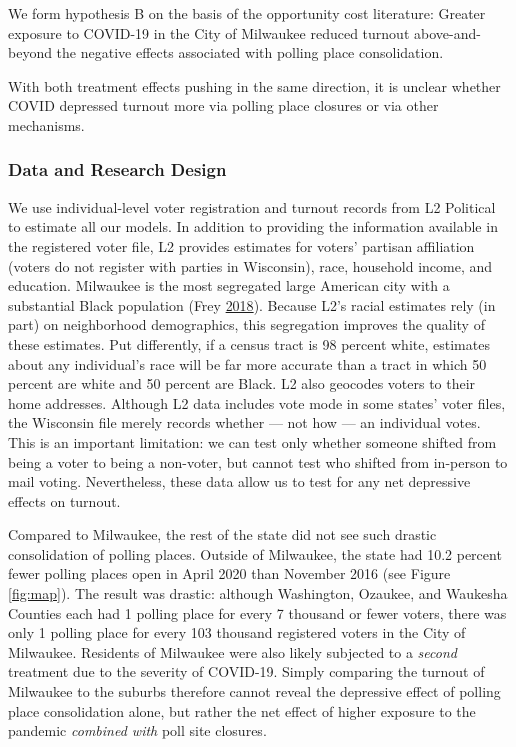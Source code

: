\documentclass[
  12pt,
]{article}
\begin{document}
We form hypothesis B on the basis of the opportunity cost literature: Greater exposure to COVID-19 in the City of Milwaukee reduced turnout above-and-beyond the negative effects associated with polling place consolidation.

With both treatment effects pushing in the same direction, it is unclear whether COVID depressed turnout more via polling place closures or via other mechanisms.

\hypertarget{data-and-research-design}{%
\subsubsection*{Data and Research Design}\label{data-and-research-design}}

We use individual-level voter registration and turnout records from L2 Political to estimate all our models. In addition to providing the information available in the registered voter file, L2 provides estimates for voters' partisan affiliation (voters do not register with parties in Wisconsin), race, household income, and education. Milwaukee is the most segregated large American city with a substantial Black population (Frey \protect\hyperlink{ref-Frey2018}{2018}). Because L2's racial estimates rely (in part) on neighborhood demographics, this segregation improves the quality of these estimates. Put differently, if a census tract is 98 percent white, estimates about any individual's race will be far more accurate than a tract in which 50 percent are white and 50 percent are Black. L2 also geocodes voters to their home addresses. Although L2 data includes vote mode in some states' voter files, the Wisconsin file merely records whether --- not how --- an individual votes. This is an important limitation: we can test only whether someone shifted from being a voter to being a non-voter, but cannot test who shifted from in-person to mail voting. Nevertheless, these data allow us to test for any net depressive effects on turnout.

Compared to Milwaukee, the rest of the state did not see such drastic consolidation of polling places. Outside of Milwaukee, the state had 10.2 percent fewer polling places open in April 2020 than November 2016 (see Figure \ref{fig:map}). The result was drastic: although Washington, Ozaukee, and Waukesha Counties each had 1 polling place for every 7 thousand or fewer voters, there was only 1 polling place for every 103 thousand registered voters in the City of Milwaukee. Residents of Milwaukee were also likely subjected to a \emph{second} treatment due to the severity of COVID-19. Simply comparing the turnout of Milwaukee to the suburbs therefore cannot reveal the depressive effect of polling place consolidation alone, but rather the net effect of higher exposure to the pandemic \emph{combined with} poll site closures.
\end{document}
